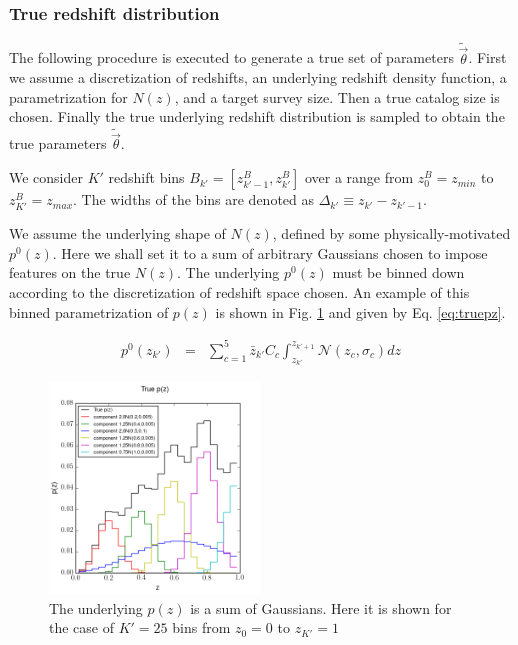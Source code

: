\documentclass[preprint]{aastex}
\begin{document}
\clearpage
\subsubsection{True redshift distribution}
\label{sec:theta}

The following procedure is executed to generate a true set of parameters $\tilde{\vec{\theta}}$.  First we assume a discretization of redshifts, an underlying redshift density function, a parametrization for $N(z)$, and a target survey size.  Then a true catalog size is chosen.  Finally the true underlying redshift distribution is sampled to obtain the true parameters $\tilde{\vec{\theta}}$.

We consider $K'$ redshift bins $B_{k'}=[z^{B}_{k'-1},z^{B}_{k'}]$ over a range from $z^{B}_{0}=z_{min}$ to $z^{B}_{K'}=z_{max}$.  The widths of the bins are denoted as $\Delta_{k'}\equiv z_{k'}-z_{k'-1}$.

We assume the underlying shape of $N(z)$, defined by some physically-motivated $p^{0}(z)$.  Here we shall set it to a sum of arbitrary Gaussians chosen to impose features on the true $N(z)$.  The underlying $p^{0}(z)$ must be binned down according to the discretization of redshift space chosen.  An example of this binned parametrization of $p(z)$ is shown in Fig. \ref{fig:physPz} and given by Eq. \ref{eq:truepz}.

\begin{eqnarray}
\label{eq:truepz}
p^{0}(z_{k'}) &=& \sum_{c=1}^{5}\bar{z}_{k'}C_{c}\int_{z_{k'}}^{z_{k'+1}} \mathcal{N}(z_{c},\sigma_{c})dz
\end{eqnarray}

\begin{figure}
\label{fig:physPz}
\includegraphics[width=0.5\textwidth]{physPz.png}
\caption{The underlying $p(z)$ is a sum of Gaussians.  Here it is shown for the case of $K'=25$ bins from $z_{0}=0$ to $z_{K'}=1$}
\end{figure}
\end{document}
